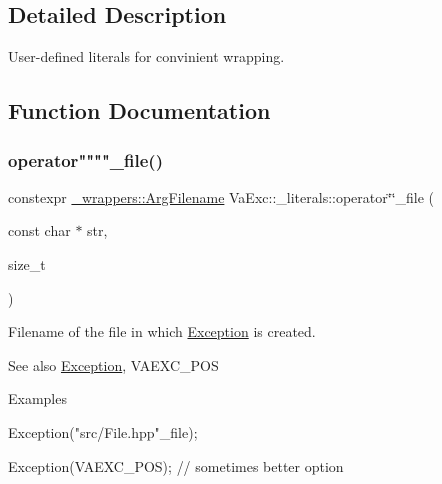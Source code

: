 \subsection{Detailed Description}
User-\/defined literals for convinient wrapping. 

\subsection{Function Documentation}
\mbox{\label{namespace_va_exc_1_1__literals_a8655907b7dc8b4d18a7c9dad04355d81}} 
\subsubsection{\texorpdfstring{operator""""\+\_\+file()}{operator""\_file()}}
{\footnotesize\ttfamily constexpr \hyperlink{struct_va_exc_1_1__wrappers_1_1_arg_filename}{\+\_\+wrappers\+::\+Arg\+Filename} Va\+Exc\+::\+\_\+literals\+::operator\char`\"{}\char`\"{}\+\_\+file (\begin{DoxyParamCaption}\item[{const char $\ast$}]{str,  }\item[{size\+\_\+t}]{ }\end{DoxyParamCaption})\hspace{0.3cm}{\ttfamily [noexcept]}}



Filename of the file in which \hyperlink{class_va_exc_1_1_exception}{Exception} is created. 

\begin{DoxySeeAlso}{See also}
\hyperlink{class_va_exc_1_1_exception}{Exception}, V\+A\+E\+X\+C\+\_\+\+P\+OS 
\end{DoxySeeAlso}
\begin{DoxyParagraph}{Examples}

\begin{DoxyCode}
Exception(\textcolor{stringliteral}{"src/File.hpp"}\_file);

Exception(VAEXC\_POS); \textcolor{comment}{// sometimes better option}
\end{DoxyCode}
 
\end{DoxyParagraph}
\mbox{\label{namespace_va_exc_1_1__literals_ae8ad698ba9e4abcd965c1c2e38fc4ff6}} 
